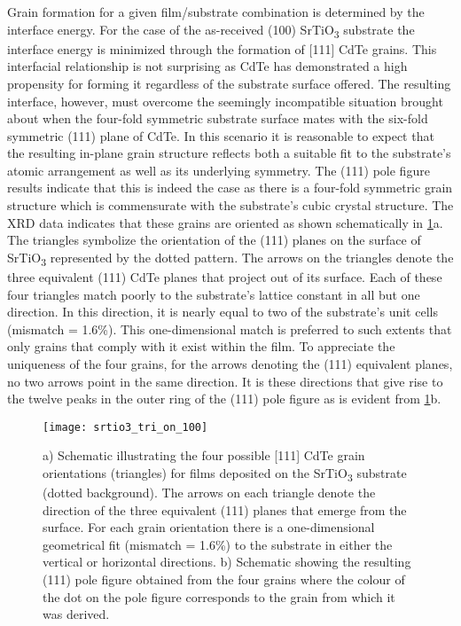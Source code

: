 Grain formation for a given film/substrate combination is determined by the interface energy.
For the case of the as-received (100) SrTiO\textsubscript{3} substrate the interface energy is minimized through the formation of [111] CdTe grains.
This interfacial relationship is not surprising as CdTe has demonstrated a high propensity for forming it regardless of the substrate surface offered\cite{Neretina2006}.
The resulting interface, however, must overcome the seemingly incompatible situation brought about when the four-fold symmetric substrate surface mates with the six-fold symmetric (111) plane of CdTe.
In this scenario it is reasonable to expect that the resulting in-plane grain structure reflects both a suitable fit to the substrate's atomic arrangement as well as its underlying symmetry.
The (111) pole figure results indicate that this is indeed the case as there is a four-fold symmetric grain structure which is commensurate with the substrate's cubic crystal structure.
The XRD data indicates that these grains are oriented as shown schematically in \cref{fig:srtio3_tri_on_100}a.
The triangles symbolize the orientation of the (111) planes on the surface of SrTiO\textsubscript{3} represented by the dotted pattern.
The arrows on the triangles denote the three equivalent (111) CdTe planes that project out of its surface.
Each of these four triangles match poorly to the substrate's lattice constant in all but one direction.
In this direction, it is nearly equal to two of the substrate's unit cells (mismatch = 1.6\%).
This
one-dimensional match is preferred to such extents that only grains that comply with it exist within the film.
To appreciate the uniqueness of the four grains, for the arrows denoting the (111) equivalent planes, no two arrows point in the same direction.
It is these directions that give rise to the twelve peaks in the outer ring of the (111) pole figure as is evident from \cref{fig:srtio3_tri_on_100}b.
\begin{figure}
 \centering \texttt{[image: srtio3\_tri\_on\_100]}
 \caption[CdTe grains on (100) SrTiO\textsubscript{3}]{\label{fig:srtio3_tri_on_100}a) Schematic illustrating the four possible [111] CdTe grain orientations (triangles) for films deposited on the SrTiO\textsubscript{3}
  substrate (dotted background).
  The arrows on each triangle denote the direction of the three equivalent (111) planes that emerge from the surface.
  For each grain orientation there is a one-dimensional geometrical fit (mismatch = 1.6\%) to the substrate in either the vertical or horizontal directions.
  b) Schematic showing the
  resulting (111) pole figure obtained from the four grains where the colour of the dot on the pole figure corresponds to the grain from which it was derived.}
\end{figure}
